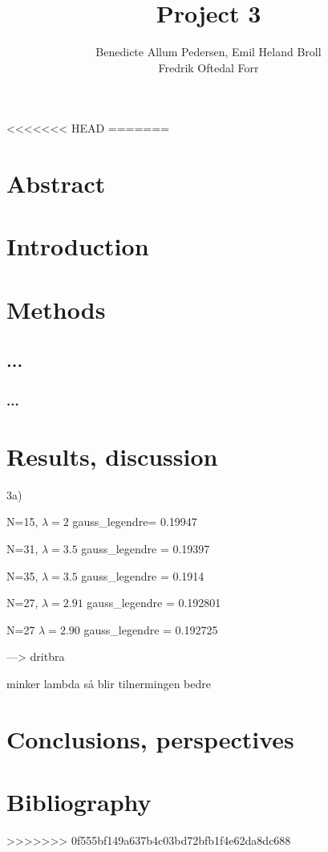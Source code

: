 \documentclass{article}
\title{Project 3}\vspace{-3ex}
\author{Benedicte Allum Pedersen, Emil Heland Broll\\ Fredrik Oftedal Forr}
\date{\vspace{-5ex}}
\begin{document}
\maketitle

<<<<<<< HEAD
=======
\section{Abstract}


\section{Introduction}



\section{Methods}
	\subsection{...}


		\subsubsection{...}

\section{Results, discussion}

3a)

N=15, $\lambda = 2$ gauss_legendre= 0.19947

N=31, $\lambda = 3.5$ gauss_legendre = 0.19397

N=35, $\lambda = 3.5$ gauss_legendre = 0.1914

N=27, $\lambda = 2.91$ gauss_legendre = 0.192801

N=27 $\lambda = 2.90$ gauss_legendre = 0.192725

---> dritbra

minker lambda så blir tilnermingen bedre


\section{Conclusions, perspectives}



\section{Bibliography}


>>>>>>> 0f555bf149a637b4c03bd72bfb1f4e62da8dc688
\end{document}
